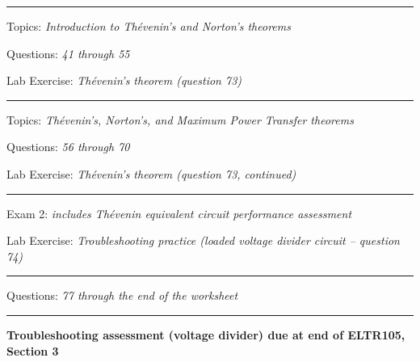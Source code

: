



\vskip 10pt
\hrule \vskip 5pt
\noindent
{}

\hskip 10pt Topics: {\it Introduction to Th\'evenin's and Norton's theorems}
 
\hskip 10pt Questions: {\it 41 through 55}
 
\hskip 10pt Lab Exercise: {\it Th\'evenin's theorem (question 73)}
 


\vskip 10pt
\hrule \vskip 5pt
\noindent
{}

\hskip 10pt Topics: {\it Th\'evenin's, Norton's, and Maximum Power Transfer theorems}
 
\hskip 10pt Questions: {\it 56 through 70} 
 
\hskip 10pt Lab Exercise: {\it Th\'evenin's theorem (question 73, continued)}
 
\vskip 10pt
\hrule \vskip 5pt
\noindent
{}

\hskip 10pt Exam 2: {\it includes Th\'evenin equivalent circuit performance assessment}
 
\hskip 10pt Lab Exercise: {\it Troubleshooting practice (loaded voltage divider circuit -- question 74)}
 
\vskip 10pt
\hrule \vskip 5pt
\noindent
{}

\hskip 10pt Questions: {\it 77 through the end of the worksheet}
 
\vskip 10pt
\hrule \vskip 5pt
\noindent
{}

\hskip 10pt {\bf Troubleshooting assessment (voltage divider) due at end of ELTR105, Section 3}
 

